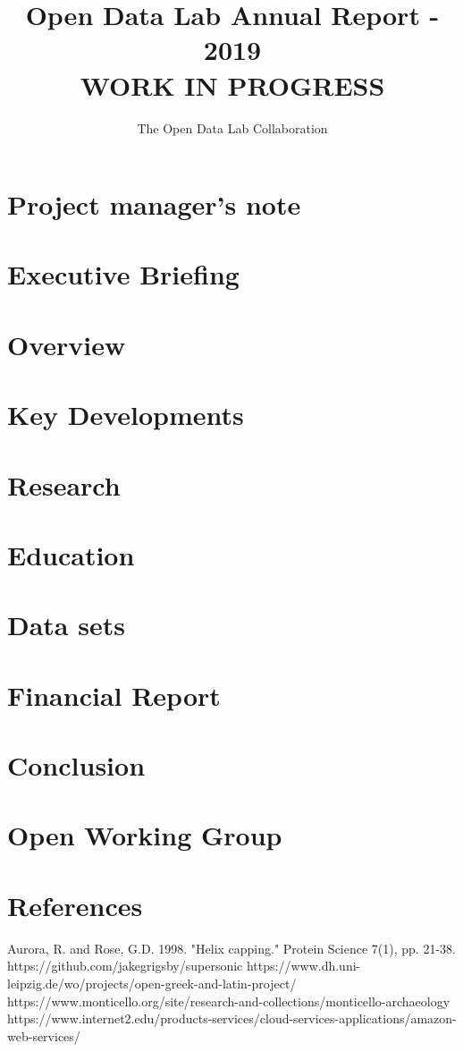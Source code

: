 \documentclass[12pt,letterpaper]{report} %
\title{Open Data Lab Annual Report - 2019\\
\large WORK IN PROGRESS}
\author{The Open Data Lab Collaboration}
\begin{document}
\maketitle
\chapter*{Project manager's note}   %
\chapter*{Executive Briefing}
\tableofcontents
\listoffigures
\listoftables
\chapter{Overview} 
\chapter{Key Developments} 
\chapter{Research} 
\chapter{Education} 
\chapter{Data sets} 	
\chapter{Financial Report} 
\chapter{Conclusion}

\appendix
\chapter{Open Working Group}\label{chap:owg}
 

\chapter{References}
\begin{thebibliography}{99}
 Aurora, R. and Rose, G.D. 1998. "Helix capping." Protein Science 7(1), pp. 21-38.
 https://github.com/jakegrigsby/supersonic
 https://www.dh.uni-leipzig.de/wo/projects/open-greek-and-latin-project/
 https://www.monticello.org/site/research-and-collections/monticello-archaeology
 https://www.internet2.edu/products-services/cloud-services-applications/amazon-web-services/
\end{thebibliography}
\end{document}

